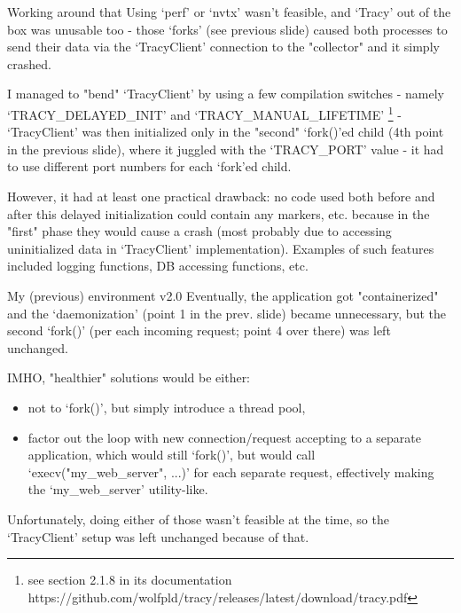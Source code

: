 \documentclass[aspectratio=169]{beamer}
\begin{document}
\begin{frame}{Working around that}
    Using `perf' or `nvtx' wasn't feasible, and `Tracy' out of the box was unusable too - those `forks' (see previous slide) caused both processes to send their data via the `TracyClient' connection to the "collector" and it simply crashed.

    I managed to "bend" `TracyClient' by using a few compilation switches - namely `TRACY\_DELAYED\_INIT' and `TRACY\_MANUAL\_LIFETIME' \footnote{see section 2.1.8 in its documentation https://github.com/wolfpld/tracy/releases/latest/download/tracy.pdf} - `TracyClient' was then initialized only in the "second" `fork()'ed child (4th point in the previous slide), where it juggled with the `TRACY\_PORT' value - it had to use different port numbers for each `fork'ed child.

    However, it had at least one practical drawback: no code used both before and after this delayed initialization could contain any markers, etc. because in the "first" phase they would cause a crash (most probably due to accessing uninitialized data in `TracyClient' implementation). Examples of such features included logging functions, DB accessing functions, etc.

\end{frame}

\begin{frame}{My (previous) environment v2.0}
    Eventually, the application got "containerized" and the `daemonization' (point 1 in the prev. slide) became unnecessary, but the second `fork()' (per each incoming request; point 4 over there) was left unchanged.

    IMHO, "healthier" solutions would be either:

    \begin{itemize}
        \item not to `fork()', but simply introduce a thread pool,
        \item factor out the loop with new connection/request accepting to a separate application, which would still `fork()', but would call `execv("my\_web\_server", ...)' for each separate request, effectively making the `my\_web\_server' utility-like.
    \end{itemize}

    Unfortunately, doing either of those wasn't feasible at the time, so the `TracyClient' setup was left unchanged because of that.

\end{frame}
\end{document}
